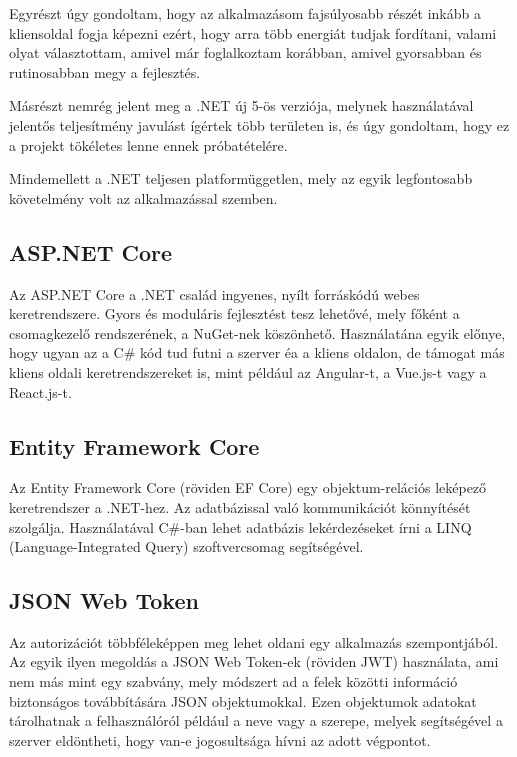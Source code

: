 Egyrészt úgy gondoltam, hogy az alkalmazásom fajsúlyosabb részét inkább a kliensoldal fogja képezni ezért, hogy arra több energiát tudjak fordítani, valami olyat választottam,
amivel már foglalkoztam korábban, amivel gyorsabban és rutinosabban megy a fejlesztés.

Másrészt nemrég jelent meg a .NET új 5-ös verziója, melynek használatával jelentős teljesítmény javulást ígértek több területen is, és úgy gondoltam, hogy ez a projekt tökéletes lenne
ennek próbatételére.

Mindemellett a .NET teljesen platformüggetlen, mely az egyik legfontosabb követelmény volt az alkalmazással szemben.

\subsection{ASP.NET Core}
Az ASP.NET Core a .NET család ingyenes, nyílt forráskódú webes keretrendszere. Gyors és moduláris fejlesztést tesz lehetővé, 
mely főként a csomagkezelő rendszerének, a NuGet-nek \cite{nuget} köszönhető.
Használatána egyik előnye, hogy ugyan az a C\# kód tud futni a szerver éa a kliens oldalon, de támogat más kliens oldali keretrendszereket is, mint például az Angular-t, a Vue.js-t
vagy a React.js-t.

\subsection{Entity Framework Core}
Az Entity Framework Core (röviden EF Core) egy objektum-relációs leképező keretrendszer a .NET-hez. Az adatbázissal való kommunikációt könnyítését szolgálja. 
Használatával C\#-ban lehet adatbázis lekérdezéseket írni a LINQ (Language-Integrated Query) szoftvercsomag segítségével.

\subsection{JSON Web Token}
Az autorizációt többféleképpen meg lehet oldani egy alkalmazás szempontjából. Az egyik ilyen megoldás a JSON Web Token-ek (röviden JWT) \cite{jwt} használata,
ami nem más mint egy szabvány, mely módszert ad a felek közötti információ biztonságos továbbítására JSON objektumokkal.
Ezen objektumok adatokat tárolhatnak a felhasználóról például a neve vagy a szerepe, melyek segítségével a szerver eldöntheti, 
hogy van-e jogosultsága hívni az adott végpontot.

